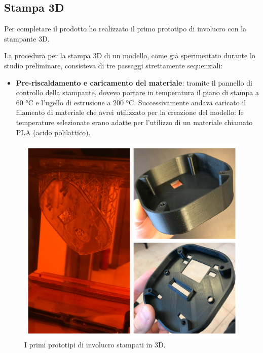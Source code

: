 \subsection{Stampa 3D}

\medskip

Per completare il prodotto ho realizzato il primo prototipo di involucro con la stampante 3D. 

La procedura per la stampa 3D di un modello, come già sperimentato durante lo studio preliminare, consisteva di tre passaggi strettamente sequenziali:
\begin{itemize}
\item \textbf{Pre-riscaldamento e caricamento del materiale}: tramite il pannello di controllo della stampante, dovevo portare in temperatura il piano di stampa a 60 °C e l'ugello di estrusione a 200 °C. Successivamente andava caricato il filamento di materiale che avrei utilizzato per la creazione del modello: le temperature selezionate erano adatte per l'utilizzo di un materiale chiamato PLA (acido polilattico).
\end{itemize}

\begin{figure}[H]
	\begin{center}
	\includegraphics[scale=0.07]{immagini/stampa_3d_finale.jpg}
	\caption{I primi prototipi di involucro stampati in 3D.}
	\end{center}
\end{figure}

